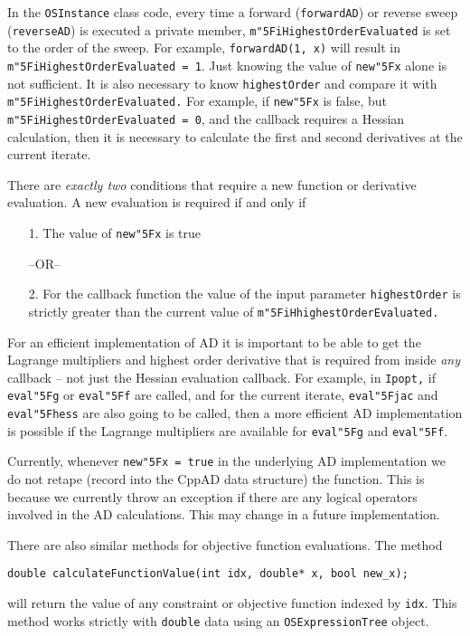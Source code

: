 \documentclass[11pt]{article}
\renewcommand{\_}{{\char"5F}}
\renewcommand{\{}{{\char"7B}}
\renewcommand{\}}{{\char"7D}}
\renewcommand{\^}{{\char"0D}}
\renewcommand{\'}{{\char"0D}}
\begin{document}
In the {\tt OSInstance} class code,  every time a forward ({\tt forwardAD}) or reverse sweep ({\tt reverseAD}) is executed a private  member, {\tt m\_iHighestOrderEvaluated}  is  set to the order of the sweep. For example, {\tt forwardAD(1, x)} will result in {\tt  m\_iHighestOrderEvaluated = 1}.  Just knowing the value  of  {\tt new\_x} alone is not sufficient. It is also necessary  to know {\tt highestOrder} and compare it with {\tt m\_iHighestOrderEvaluated.}  For example, if  {\tt new\_x}  is  false,  but {\tt m\_iHighestOrderEvaluated = 0},  and   the callback requires a Hessian calculation, then it is necessary to calculate the first and second derivatives at the current iterate.

There are {\it  exactly two} conditions that  require a new function or derivative evaluation.   A new evaluation is required if and only if

\begin{itemize}
\item[1.]   The value of {\tt new\_x} is  true

\begin{center}
 --OR--
\end{center}


\item[2.] For the callback function the value of the input parameter {\tt highestOrder} is strictly greater than the current value  of    {\tt m\_iHhighestOrderEvaluated.}
\end{itemize}

For an efficient implementation of AD it is important to be able to get the Lagrange multipliers and highest order derivative that is required from inside {\it any} callback -- not just the Hessian evaluation callback. For example, in {\tt Ipopt,} if  {\tt eval\_g}  or {\tt eval\_f} are called, and  for the current iterate, {\tt eval\_jac} and {\tt eval\_hess} are also going to be called, then  a more efficient AD implementation is possible if the Lagrange multipliers are available for {\tt eval\_g} and {\tt eval\_f}.

Currently, whenever {\tt new\_x = true} in the underlying AD implementation we do not retape (record into the CppAD data structure)  the function. This is because we currently throw an exception if there are any logical operators involved in the AD calculations. This may change in a future implementation.


There are also similar methods for objective function evaluations.  The method
\begin{verbatim}
double calculateFunctionValue(int idx, double* x, bool new_x);
\end{verbatim}
 will return the value of any constraint or objective function indexed by {\tt idx}. This method works strictly with {\tt double} data using an {\tt OSExpressionTree} object.
\end{document}
